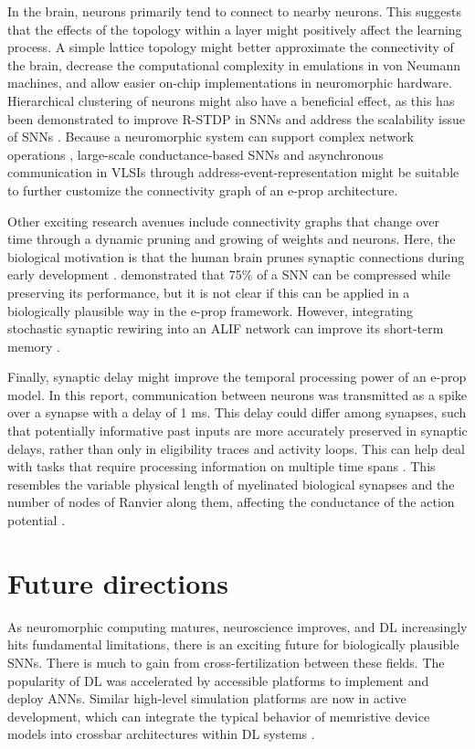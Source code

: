     In the brain, neurons primarily tend to connect to nearby neurons.
    This suggests that the effects of the topology within a layer might positively affect the learning process.
    A simple lattice topology might better approximate the connectivity of the brain, decrease the computational complexity in emulations in von Neumann machines, and allow easier on-chip implementations in neuromorphic hardware.
    Hierarchical clustering of neurons might also have a beneficial effect, as this has been demonstrated to improve R-STDP in SNNs \citep{weidel2021unsupervised} and address the scalability issue of SNNs \citep{carrillo2012scalable}.
    Because a neuromorphic system can support complex network operations \citep{hasler1990vlsi}, large-scale conductance-based SNNs \citep{yang2019scalable,Yang2019RealTimeNS} and asynchronous communication in VLSIs through address-event-representation \citep{lazzaro1993silicon,deiss1999pulse} might be suitable to further customize the connectivity graph of an e-prop architecture.

    Other exciting research avenues include connectivity graphs that change over time through a dynamic pruning and growing of weights and neurons.
    Here, the biological motivation is that the human brain prunes synaptic connections during early development \citep{huttenlocher1979synaptic}.
    \citet{elbez2020progressive} demonstrated that 75\% of a SNN can be compressed while preserving its performance, but it is not clear if this can be applied in a biologically plausible way in the e-prop framework.
    However, integrating stochastic synaptic rewiring \citep{kappel2018dynamic} into an ALIF network can improve its short-term memory \citep{bellec2020solution}.

    Finally, synaptic delay might improve the temporal processing power of an e-prop model.
    In this report, communication between neurons was transmitted as a spike over a synapse with a delay of 1 ms.
    This delay could differ among synapses, such that potentially informative past inputs are more accurately preserved in synaptic delays, rather than only in eligibility traces and activity loops.
    This can help deal with tasks that require processing information on multiple time spans \citep{jaeger2021dimensions}.
    This resembles the variable physical length of myelinated biological synapses and the number of nodes of Ranvier along them, affecting the conductance of the action potential \citep{bean2007action}.


\section{Future directions}
    As neuromorphic computing matures, neuroscience improves, and DL increasingly hits fundamental limitations, there is an exciting future for biologically plausible SNNs.
    There is much to gain from cross-fertilization between these fields.
    The popularity of DL was accelerated by accessible platforms to implement and deploy ANNs.
    Similar high-level simulation platforms are now in active development, which can integrate the typical behavior of memristive device models into crossbar architectures within DL systems \citep{lammie2020memtorch}.

